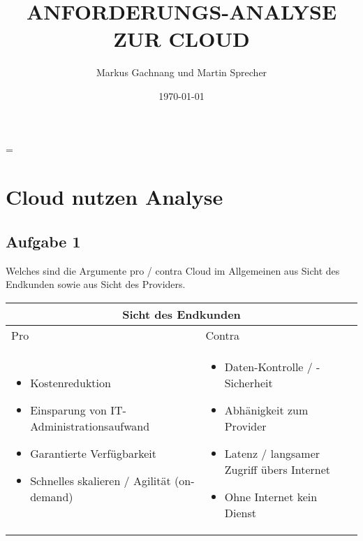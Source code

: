 \documentclass[11pt,titlepage]{article}
\title{ANFORDERUNGS-ANALYSE ZUR CLOUD}
\author{Markus Gachnang und Martin Sprecher}
\date{\today{}}
\newenvironment{shadedquotation}
 {\begin{shaded*}
  \quoting[leftmargin=0pt, vskip=0pt]
 }
 {\endquoting
 \end{shaded*}
}
\begin{document}
\sffamily
\maketitle
\newpage
\tableofcontents{}
\setcounter{page}{1}
\newpage
\RaggedRight
\emergencystretch=\maxdimen
{}
\section{Cloud nutzen Analyse}
\subsection{Aufgabe 1}
\label{sec:Aufgabe-1}

\begin{shadedquotation}
  Welches sind die Argumente pro / contra Cloud im Allgemeinen aus Sicht des Endkunden sowie aus Sicht des Providers.
\end{shadedquotation}

\par\medskip

\begin{tabular}{ |p{7cm}|p{7cm}|  }
  \hline
  \multicolumn{2}{|c|}{Sicht des Endkunden} \\
  \hline
  Pro & Contra \\
  \hline
  \begin{itemize}
    \item Kostenreduktion
    \item Einsparung von IT-Administrationsaufwand 
    \item Garantierte Verfügbarkeit 
    \item Schnelles skalieren / Agilität (on-demand)
  \end{itemize}
  & 
  \begin{itemize}
    \item Daten-Kontrolle / -Sicherheit
    \item Abhänigkeit zum Provider
    \item Latenz / langsamer Zugriff übers Internet
    \item Ohne Internet kein Dienst
  \end{itemize}
  \\
  \hline
\end{tabular}

\par\medskip
\end{document}
